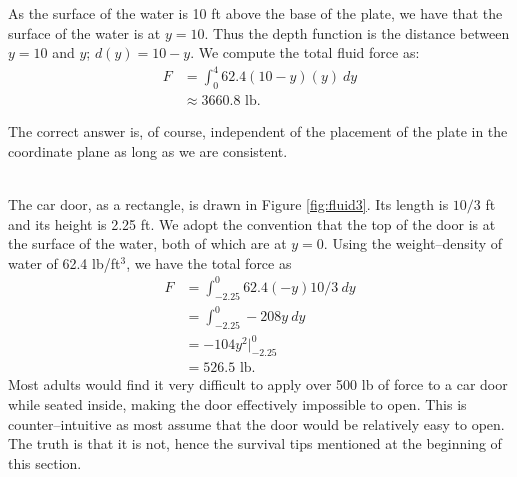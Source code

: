 {\begin{enumerate}
As the surface of the water is 10 ft above the base of the plate, we have that the surface of the water is at $y=10$. Thus the depth function is the distance between $y=10$ and $y$; $d(y) = 10-y$. We compute the total fluid force as:
\begin{align*}
F	&=\int_0^4 62.4(10-y)(y)\ dy \\
	&\approx 3660.8\text{ lb}.
\end{align*}
\end{enumerate}
The correct answer is, of course, independent of the placement of the plate in the coordinate plane as long as we are consistent.
}\\

{The car door, as a rectangle, is drawn in Figure \ref{fig:fluid3}. Its length is $10/3$ ft and its height is 2.25 ft. We adopt the convention that the top of the door is at the surface of the water, both of which are at $y=0$. Using the weight--density of water of 62.4 lb/ft$^3$, we have the total force as
\begin{align*}
F &=	\int_{-2.25}^0 62.4(-y)10/3\ dy \\
	&= 	\int_{-2.25}^0 -208y\ dy\\
	&= -104y^2\Big|_{-2.25}^0 \\
	&=	526.5 \text{ lb.}
\end{align*}
Most adults would find it very difficult to apply over 500 lb of force to a car door while seated inside, making the door effectively impossible to open. This  is  counter--intuitive as most assume that the door would be relatively easy to open. The truth is that it is not, hence the survival tips mentioned at the beginning of this section.
}\\

